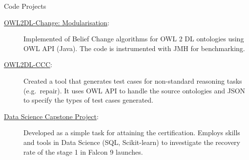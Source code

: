 %

\begin{rSection}{Code Projects}
    \begin{description}
        \item[\href{https://gitlab.com/rfguimaraes/owl-change}{OWL2DL-Change: Modularisation}:] Implemented of Belief Change algorithms for OWL 2 DL ontologies using OWL API (Java). The code is instrumented with JMH for benchmarking.
        \item[\href{https://gitlab.com/rfguimaraes/owl2dl-ccc}{OWL2DL-CCC}:] Created a tool that generates test cases for non-standard reasoning tasks (e.g.\ repair). It uses OWL API to handle the source ontologies and JSON to specify the types of test cases generated.
        \item[\href{https://github.com/rfguimaraes/DataScienceCapstone}{Data Science Capstone Project}:] Developed as a simple task for attaining the certification. Employs skills and tools in Data Science (SQL, Scikit-learn) to investigate the recovery rate of the stage 1 in Falcon 9 launches.
    \end{description}
\end{rSection}

